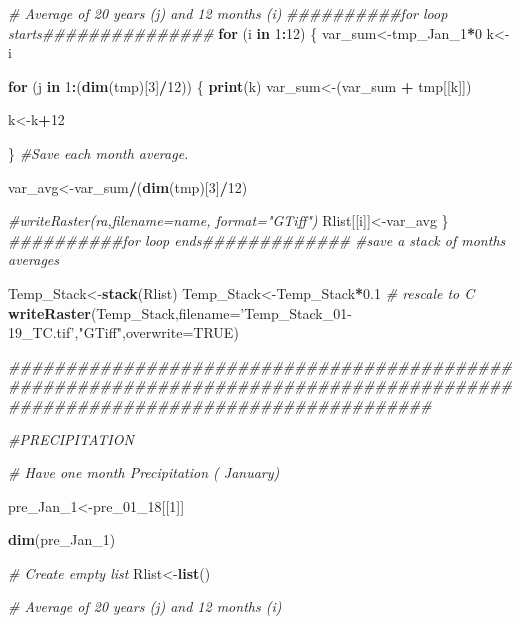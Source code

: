 \documentclass[
  10pt,
  b5paper,
]{book}
\newenvironment{Shaded}{\begin{snugshade}}{\end{snugshade}}
\newcommand{\CommentTok}[1]{\textcolor[rgb]{0.56,0.35,0.01}{\textit{#1}}}
\newcommand{\ControlFlowTok}[1]{\textcolor[rgb]{0.13,0.29,0.53}{\textbf{#1}}}
\newcommand{\DataTypeTok}[1]{\textcolor[rgb]{0.13,0.29,0.53}{#1}}
\newcommand{\DecValTok}[1]{\textcolor[rgb]{0.00,0.00,0.81}{#1}}
\newcommand{\FloatTok}[1]{\textcolor[rgb]{0.00,0.00,0.81}{#1}}
\newcommand{\KeywordTok}[1]{\textcolor[rgb]{0.13,0.29,0.53}{\textbf{#1}}}
\newcommand{\NormalTok}[1]{#1}
\newcommand{\OperatorTok}[1]{\textcolor[rgb]{0.81,0.36,0.00}{\textbf{#1}}}
\newcommand{\OtherTok}[1]{\textcolor[rgb]{0.56,0.35,0.01}{#1}}
\newcommand{\StringTok}[1]{\textcolor[rgb]{0.31,0.60,0.02}{#1}}
\begin{document}
\begin{Shaded}
\begin{Highlighting}[]
\CommentTok{# Average of 20 years (j)  and 12 months (i) }
\CommentTok{##########for loop starts###############}
\ControlFlowTok{for}\NormalTok{ (i }\ControlFlowTok{in} \DecValTok{1}\OperatorTok{:}\DecValTok{12}\NormalTok{) \{ }
\NormalTok{var_sum<-tmp_Jan_}\DecValTok{1}\OperatorTok{*}\DecValTok{0}
\NormalTok{k<-i}

\ControlFlowTok{for}\NormalTok{ (j }\ControlFlowTok{in} \DecValTok{1}\OperatorTok{:}\NormalTok{(}\KeywordTok{dim}\NormalTok{(tmp)[}\DecValTok{3}\NormalTok{]}\OperatorTok{/}\DecValTok{12}\NormalTok{)) \{}
\KeywordTok{print}\NormalTok{(k)}
\NormalTok{var_sum<-(var_sum }\OperatorTok{+}\StringTok{ }\NormalTok{tmp[[k]])}

\NormalTok{k<-k}\OperatorTok{+}\DecValTok{12}

\NormalTok{\}}
\CommentTok{#Save each month average. }

\NormalTok{var_avg<-var_sum}\OperatorTok{/}\NormalTok{(}\KeywordTok{dim}\NormalTok{(tmp)[}\DecValTok{3}\NormalTok{]}\OperatorTok{/}\DecValTok{12}\NormalTok{)}

\CommentTok{#writeRaster(ra,filename=name, format="GTiff")}
\NormalTok{Rlist[[i]]<-var_avg}
\NormalTok{\}}
\CommentTok{##########for loop ends#############}
\CommentTok{#save a stack of months averages}

\NormalTok{Temp_Stack<-}\KeywordTok{stack}\NormalTok{(Rlist)}
\NormalTok{Temp_Stack<-Temp_Stack}\OperatorTok{*}\FloatTok{0.1} \CommentTok{# rescale to C}
\KeywordTok{writeRaster}\NormalTok{(Temp_Stack,}\DataTypeTok{filename=}\StringTok{'Temp_Stack_01-19_TC.tif'}\NormalTok{,}\StringTok{"GTiff"}\NormalTok{,}\DataTypeTok{overwrite=}\OtherTok{TRUE}\NormalTok{)}



\CommentTok{#############################################################################################################################}

\CommentTok{#PRECIPITATION}


\CommentTok{# Have one month Precipitation ( January)}

\NormalTok{pre_Jan_}\DecValTok{1}\NormalTok{<-pre_}\DecValTok{01}\NormalTok{_}\DecValTok{18}\NormalTok{[[}\DecValTok{1}\NormalTok{]]}

\KeywordTok{dim}\NormalTok{(pre_Jan_}\DecValTok{1}\NormalTok{)}

\CommentTok{# Create empty list}
\NormalTok{Rlist<-}\KeywordTok{list}\NormalTok{()}


\CommentTok{# Average of 20 years (j)  and 12 months (i) }


\end{Highlighting}
\end{Shaded}
\end{document}
